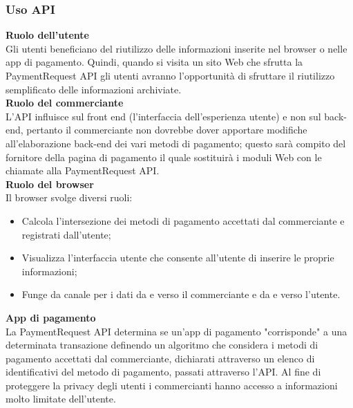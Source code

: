 \documentclass[11pt ,a4paper , twoside , openright ]{article}
\begin{document}
\subsubsection{Uso API}
\textbf{Ruolo dell'utente}
\\
Gli utenti beneficiano del riutilizzo delle informazioni inserite nel browser o nelle app di pagamento. Quindi, quando si visita un sito Web che sfrutta la PaymentRequest API gli utenti avranno l'opportunità di sfruttare il riutilizzo semplificato delle informazioni archiviate.
\\
\textbf{Ruolo del commerciante}
\\
L'API influisce sul front end (l'interfaccia dell'esperienza utente) e non sul back-end, pertanto il commerciante non dovrebbe dover apportare modifiche all'elaborazione back-end dei vari metodi di pagamento; questo sarà compito del fornitore della pagina di pagamento il quale sostituirà i moduli Web con le chiamate alla PaymentRequest API.
\\
\textbf{Ruolo del browser}
\\
Il browser svolge diversi ruoli:
\begin{itemize}
	\item Calcola l'intersezione dei metodi di pagamento accettati dal commerciante e registrati dall'utente;
	\item Visualizza l'interfaccia utente che consente all'utente di inserire le proprie informazioni;
	\item Funge da canale per i dati da e verso il commerciante e da e verso l'utente.
\end{itemize}
\textbf{App di pagamento}
\\
La PaymentRequest API determina se un'app di pagamento "corrisponde" a una determinata transazione definendo un algoritmo che considera i metodi di pagamento accettati dal commerciante, dichiarati attraverso un elenco di identificativi del metodo di pagamento, passati attraverso l'API.
Al fine di proteggere la privacy degli utenti i commercianti hanno accesso a informazioni molto limitate dell'utente. 
\end{document}
